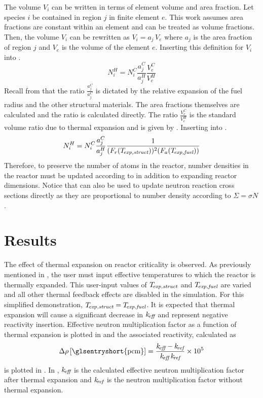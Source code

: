     The volume $V_i$ can be written in terms of element volume and area
    fraction. Let species $i$ be contained in region $j$ in finite element $e$. 
    This work assumes area fractions are constant within an element and can be
    treated as volume fractions. Then, the volume $V_i$ can be rewritten as 
    $V_i = a_j \, V_e$ where $a_j$ is the area fraction of region $j$ and $V_e$
    is the volume of the element $e$. Inserting this definition for $V_i$ into
    .
    \begin{equation}
      \label{eq:nden_expansion_expanded}
      N_i^H = N_i^C \frac{a_j^C}{a_j^H} \frac{V_e^C}{V_e^H}
    \end{equation}
    Recall from  that the
    ratio $\frac{a_j^C}{a_j^C}$ is dictated by the relative expansion of the
    fuel radius and the other structural materials. The area fractions
    themselves are calculated and the ratio is calculated directly. The 
    ratio $\frac{V_e^C}{V_e^H}$ is the standard volume ratio due to thermal 
    expansion and is given by . Inserting 
     into .
    \begin{equation}
      \label{eq:nden_thexp_update}
      N_i^H = N_i^C \frac{a_j^C}{a_j^H} 
        \frac{1}{(F_r(T_{\!\mbox{\scriptsize \em exp,struct}}))^2 (F_a({T_{\!\mbox{\scriptsize \em exp,fuel}}}))}
    \end{equation}
    Therefore, to preserve the number of atoms in the reactor, number densities
    in the reactor must be updated according to  in
    addition to expanding reactor dimensions. Notice that
     can also be used to update neutron reaction
    cross sections directly as they are proportional to number density according
    to $\Sigma = \sigma N$.

\section{Results}
  The effect of thermal expansion on reactor criticality is observed. As
  previously mentioned in ,
  the user must input effective temperatures to which the reactor is thermally
  expanded. This user-input values of $T_{\!\mbox{\scriptsize \em exp,struct}}$ and ${T_{\!\mbox{\scriptsize \em exp,fuel}}}$ are varied
  and all other thermal feedback effects are disabled in the simulation. For
  this simplified demonstration, $T_{\!\mbox{\scriptsize \em exp,struct}}={T_{\!\mbox{\scriptsize \em exp,fuel}}}$. It is expected that
  thermal expansion will cause a significant decrease in $k_{\!\mbox{\scriptsize \em eff}}$ and represent
  negative reactivity insertion. Effective neutron multiplication factor as a
  function of thermal expansion is plotted in  and the
  associated reactivity, calculated as
  \begin{equation}
    \label{eq:reactivity_formula}
    \Delta \rho \units{\glsentryshort{pcm}} = \frac{\keff - \kref}{\keff \, \kref} \times 10^5
  \end{equation}
  is plotted in . In
  , $k_{\!\mbox{\scriptsize \em eff}}$ is the calculated effective neutron
  multiplication factor after thermal expansion and $k_{\!\mbox{\scriptsize \em ref}}$ is the neutron
  multiplication factor without thermal expansion. 

